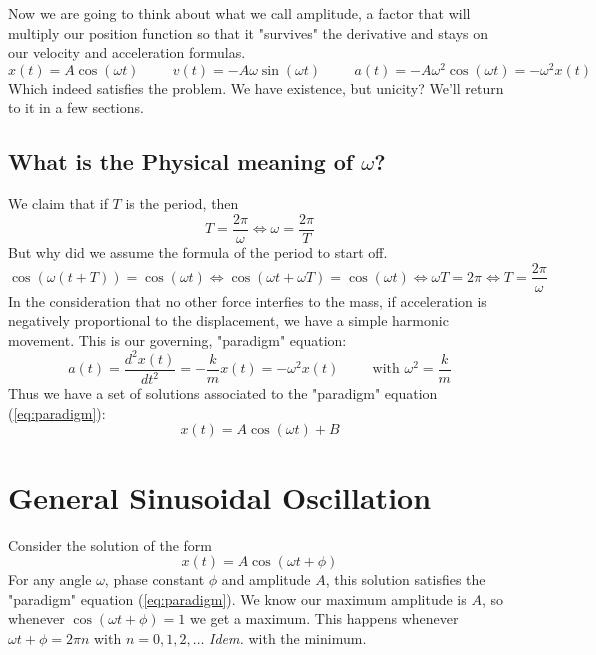 \documentclass{report}
\begin{document}
      \noindent Now we are going to think about what we call amplitude, a factor that will multiply our position function so that it "survives" the derivative and stays on our velocity and acceleration formulas.
      \begin{equation}
        x(t)=A\cos(\omega t)\hspace{1cm}v(t)=-A\omega\sin(\omega t)\hspace{1cm}a(t)=-A\omega^2\cos(\omega t)=-\omega^2 x(t)
      \end{equation}
      \noindent Which indeed satisfies the problem. We have existence, but unicity? We'll return to it in a few sections.
      \clearpage

    \subsection{What is the Physical meaning of $\omega$?}
      We claim that if $T$ is the period, then
      \begin{equation}
        T=\dfrac{2\pi}{\omega}\Longleftrightarrow\omega=\dfrac{2\pi}{T}
      \end{equation}
      But why did we assume the formula of the period to start off.
      \begin{equation}
        \cos(\omega(t+T))=\cos(\omega t)\Longleftrightarrow\cos(\omega t+\omega T)=\cos(\omega t)\Longleftrightarrow \omega T=2\pi\Longleftrightarrow T=\dfrac{2\pi}{\omega}
      \end{equation}
      \noindent In the consideration that no other force interfies to the mass, if acceleration is negatively proportional to the displacement, we have a simple harmonic movement. This is our governing, "paradigm" equation:
      \begin{equation}
        a(t)=\dfrac{d^2 x(t)}{dt^2}=-\dfrac{k}{m}x(t)=-\omega^2 x(t)\hspace{1cm}\text{with }\omega^2=\dfrac{k}{m}
        \label{eq:paradigm}
      \end{equation}
      Thus we have a set of solutions associated to the "paradigm" equation (\ref{eq:paradigm}):
      \begin{equation}
        x(t)=A\cos\left(\omega t\right)+B %
      \end{equation}
    \section{General Sinusoidal Oscillation}
      Consider the solution of the form
      \begin{equation}
        x(t)=A\cos(\omega t +\phi)
        \label{eq:general_sinusoidal}
      \end{equation}
      For any angle $\omega$, phase constant $\phi$ and amplitude $A$, this solution satisfies the "paradigm" equation (\ref{eq:paradigm}). We know our maximum amplitude is $A$, so whenever $\cos(\omega t+\phi)=1$ we get a maximum. This happens whenever $\omega t+\phi=2\pi n$ with $n=0,1,2,\dots$ \textit{Idem.} with the minimum.\\
\end{document}
